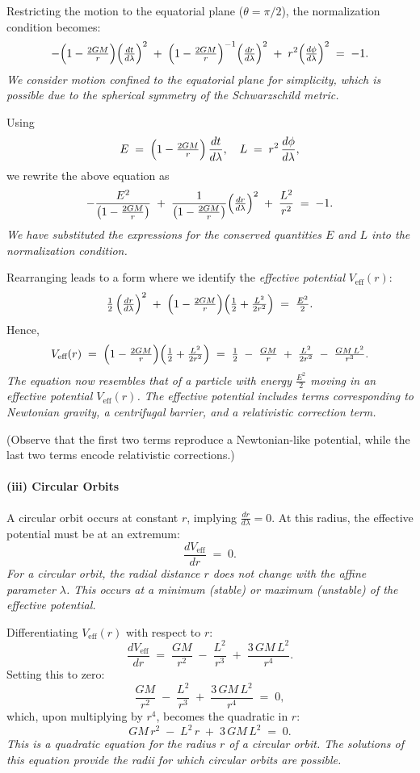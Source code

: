 Restricting the motion to the equatorial plane ($\theta = \pi/2$), the normalization condition becomes:
\[
-\Bigl(1 - \tfrac{2GM}{r}\Bigr)
\Bigl(\tfrac{dt}{d\lambda}\Bigr)^2
\;+\;\Bigl(1 - \tfrac{2GM}{r}\Bigr)^{-1}
\Bigl(\tfrac{dr}{d\lambda}\Bigr)^2
\;+\; r^2 \Bigl(\tfrac{d\phi}{d\lambda}\Bigr)^2
\;=\; -1.
\]
\textit{We consider motion confined to the equatorial plane for simplicity, which is possible due to the spherical symmetry of the Schwarzschild metric.}

Using
\[
E \;=\;\Bigl(1 - \tfrac{2GM}{r}\Bigr)\,\frac{dt}{d\lambda},
\quad
L \;=\; r^2\,\frac{d\phi}{d\lambda},
\]
we rewrite the above equation as
\[
-\frac{E^2}{\bigl(1 - \tfrac{2GM}{r}\bigr)}
\;+\;\frac{1}{\bigl(1 - \tfrac{2GM}{r}\bigr)}
\Bigl(\tfrac{dr}{d\lambda}\Bigr)^2
\;+\;\frac{L^2}{r^2}
\;=\; -1.
\]
\textit{We have substituted the expressions for the conserved quantities $E$ and $L$ into the normalization condition.}

Rearranging leads to a form where we identify the \emph{effective potential} $V_{\text{eff}}(r)$:
\[
\tfrac{1}{2}\,\Bigl(\tfrac{dr}{d\lambda}\Bigr)^2
\;+\;
\Bigl(1 - \tfrac{2GM}{r}\Bigr)\Bigl(\tfrac{1}{2} + \tfrac{L^2}{2r^2}\Bigr)
\;=\; \tfrac{E^2}{2}.
\]
Hence,
\[
V_{\text{eff}}(r)
\;=\;
\Bigl(1 - \tfrac{2GM}{r}\Bigr)\Bigl(\tfrac{1}{2} + \tfrac{L^2}{2r^2}\Bigr)
\;=\;
\tfrac{1}{2} \;-\;\tfrac{GM}{r} \;+\;\tfrac{L^2}{2r^2} \;-\;\tfrac{GM\,L^2}{r^3}.
\]
\textit{The equation now resembles that of a particle with  energy  $\tfrac{E^2}{2}$ moving in an effective potential $V_{\text{eff}}(r)$. The effective potential includes terms corresponding to Newtonian gravity, a centrifugal barrier, and a relativistic correction term.}

(Observe that the first two terms reproduce a Newtonian-like potential, while the last two terms encode relativistic corrections.)

\paragraph{(iii) Circular Orbits}

A circular orbit occurs at constant $r$, implying $\tfrac{dr}{d\lambda} = 0$. At this radius, the effective potential must be at an extremum:
\[
\frac{dV_{\text{eff}}}{dr} \;=\; 0.
\]
\textit{For a circular orbit, the radial distance $r$ does not change with the affine parameter $\lambda$. This occurs at a minimum (stable) or maximum (unstable) of the effective potential.}

Differentiating $V_{\text{eff}}(r)$ with respect to $r$:
\[
\frac{dV_{\text{eff}}}{dr}
\;=\;
\frac{GM}{r^2} \;-\;\frac{L^2}{r^3} \;+\;\frac{3\,GM\,L^2}{r^4}.
\]
Setting this to zero:
\[
\frac{GM}{r^2}
\;-\;\frac{L^2}{r^3}
\;+\;\frac{3\,GM\,L^2}{r^4}
\;=\;0,
\]
which, upon multiplying by $r^4$, becomes the quadratic in $r$:
\[
GM\,r^2
\;-\;L^2\,r
\;+\;3\,GM\,L^2
\;=\;0.
\]
\textit{This is a quadratic equation for the radius $r$ of a circular orbit. The solutions of this equation provide the radii for which circular orbits are possible.}

